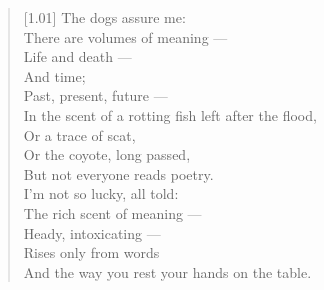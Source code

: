 \begin{verse}[1.01\textwidth]
  The dogs assure me:\\
  There are volumes of meaning ---\\
  Life and death ---\\
  And time;\\
  Past, present, future ---\\
  In the scent of a rotting fish left after the flood,\\
  Or a trace of scat,\\
  Or the coyote, long passed,\\
  But not everyone reads poetry.\\

  \vspace{1pc}
  I'm not so lucky, all told:\\
  The rich scent of meaning ---\\
  Heady, intoxicating ---\\
  Rises only from words\\
  And the way you rest your hands on the table.
\end{verse}
